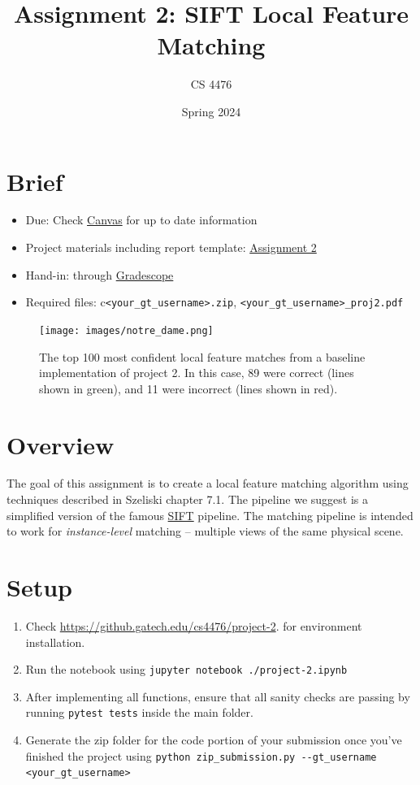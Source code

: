 \documentclass{article}
\title{Assignment 2: SIFT Local Feature Matching}
\author{CS 4476}
\date{Spring 2024}
\begin{document}
\maketitle

\section*{Brief}
\begin{itemize}
    \item{Due: Check \href{https://gatech.instructure.com/courses/366842}{Canvas} for up to date information}
    \item{Project materials including report template: \href{https://github.gatech.edu/vision}{Assignment 2}}
    \item{Hand-in: through \href{https://www.gradescope.com}{Gradescope}}
    \item{Required files: c\lstinline{<your_gt_username>.zip}, \lstinline{<your_gt_username>_proj2.pdf}}
\end{itemize}

\begin{figure}[h]
    \centering
    \texttt{[image: images/notre\_dame.png]}
    \caption{The top 100 most confident local feature matches from a baseline implementation of project 2. In this case, 89 were correct (lines shown in green), and 11 were incorrect (lines shown in red).}
    \label{fig:notre-dame}
\end{figure}


\section*{Overview}
The goal of this assignment is to create a local feature matching algorithm using techniques described in Szeliski chapter 7.1. The pipeline we suggest is a simplified version of the famous \href{https://www.cs.ubc.ca/~lowe/keypoints/}{SIFT} pipeline. The matching pipeline is intended to work for \textit{instance-level} matching -- multiple views of the same physical scene.


\section*{Setup}
\begin{enumerate}
    \item Check \href{https://github.gatech.edu/cs4476/project-2/blob/main/README.md}{https://github.gatech.edu/cs4476/project-2}. for environment installation.
    \item Run the notebook using \lstinline{jupyter notebook ./project-2.ipynb}
    \item After implementing all functions, ensure that all sanity checks are passing by running \lstinline{pytest tests} inside the main folder.
    \item Generate the zip folder for the code portion of your submission once you've finished the project using \lstinline{python zip_submission.py --gt_username <your_gt_username>}
\end{enumerate}
\end{document}
